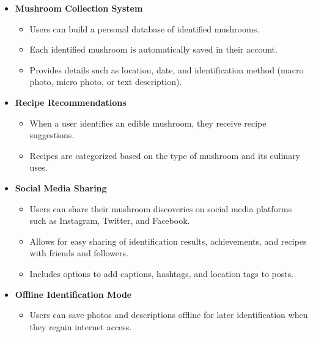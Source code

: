 \documentclass{article}
\begin{document}
\begin{itemize}
    \item \textbf{Mushroom Collection System}  
    \begin{itemize}
        \item Users can build a personal database of identified mushrooms.
        \item Each identified mushroom is automatically saved in their account.
        \item Provides details such as location, date, and identification method (macro photo, micro photo, or text description).
    \end{itemize}

    \item \textbf{Recipe Recommendations}  
    \begin{itemize}
        \item When a user identifies an edible mushroom, they receive recipe suggestions.
        \item Recipes are categorized based on the type of mushroom and its culinary uses.
    \end{itemize}


    \item \textbf{Social Media Sharing}  
    \begin{itemize}
        \item Users can share their mushroom discoveries on social media platforms such as Instagram, Twitter, and Facebook.
        \item Allows for easy sharing of identification results, achievements, and recipes with friends and followers.
        \item Includes options to add captions, hashtags, and location tags to posts.
    \end{itemize}

    \item \textbf{Offline Identification Mode}  
    \begin{itemize}
        \item Users can save photos and descriptions offline for later identification when they regain internet access.
    \end{itemize}
\end{itemize}
\end{document}
